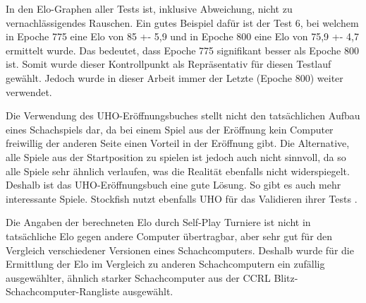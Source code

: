 In den Elo-Graphen aller Tests ist, inklusive Abweichung, nicht zu vernachlässigendes Rauschen. Ein gutes Beispiel dafür ist der Test 6, bei welchem in Epoche 775 eine Elo von 85 +- 5,9 und in Epoche 800 eine Elo von 75,9 +- 4,7 ermittelt wurde. Das bedeutet, dass Epoche 775 signifikant besser als Epoche 800 ist. Somit wurde dieser Kontrollpunkt als Repräsentativ für diesen Testlauf gewählt. Jedoch wurde in dieser Arbeit immer der Letzte (Epoche 800) weiter verwendet.



Die Verwendung des \ac{UHO}-Eröffnungsbuches stellt nicht den tatsächlichen Aufbau eines Schachspiels dar, da bei einem Spiel aus der Eröffnung kein Computer freiwillig der anderen Seite einen Vorteil in der Eröffnung gibt. Die Alternative, alle Spiele aus der Startposition zu spielen ist jedoch auch nicht sinnvoll, da so alle Spiele sehr ähnlich verlaufen, was die Realität ebenfalls nicht widerspiegelt. Deshalb ist das \ac{UHO}-Eröffnungsbuch eine gute Lösung. So gibt es auch mehr interessante Spiele. Stockfish nutzt ebenfalls \ac{UHO} für das Validieren ihrer Tests \cite{Fishtest}. 

Die Angaben der berechneten Elo durch Self-Play Turniere ist nicht in tatsächliche Elo gegen andere Computer übertragbar, aber sehr gut für den Vergleich verschiedener Versionen eines Schachcomputers. Deshalb wurde für die Ermittlung der Elo im Vergleich zu anderen Schachcomputern ein zufällig ausgewählter, ähnlich starker Schachcomputer aus der \ac{CCRL} \cite{CCRL} Blitz-Schachcomputer-Rangliste ausgewählt.

